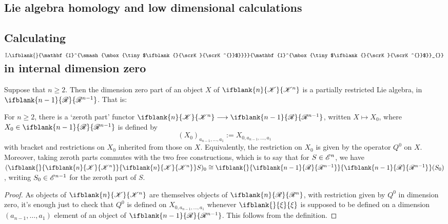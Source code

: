 \documentclass[10pt]{article}
\newcommand{\GS}[1]{\scrE^{#1}}
\newcommand{\PRLie}[1]%
{\ifblank{#1}{\scrR}{\scrR^{#1}}}
\newcommand{\LL}[1]{\ifblank{#1}{\scrK}{\scrK^{#1}}}
\newcommand{\Ind}[2][]{\ifblank{#1}{\mathbf{I}^{\smash{\mbox{\tiny $#2$}}}}{\mathbf{I}^{\mbox{\tiny $#2$}}_{#1}}}%
\newcommand{\Fr}[2][]{\ifblank{#1}{#2}{#2_{#1}}}
\newcommand{\restn}[2][]{\ifblank{#1}{\xi{#2}}{\xi_{#1}{#2}}}%
\newcommand{\derived}{\mathbb{L}}
\renewcommand{\Q}{Q}
\begin{document}
\begin{DerivedFunctorsLowDimension}
\section{Lie algebra homology and low dimensional calculations}
\subsection{Calculating $\derived\Ind{\LL{}}$ in internal dimension zero}
Suppose that $n\geq2$. Then the dimension zero part of an object $X$ of $\LL{n}$ is a partially restricted Lie algebra, in $\PRLie{n-1}$. That is: 
\begin{lem}
For $n\geq2$, there is a `zeroth part' functor $\LL{n}\to\PRLie{n-1}$, written $X\mapsto X_0$, where $X_0\in\PRLie{n-1}$ is defined by
\[(X_0)_{a_{n-1},\ldots,a_1}:=X_{0,a_{n-1},\ldots,a_1}\]
with bracket and restrictions on $X_0$ inherited from those on $X$. Equivalently, the restriction on $X_0$ is given by the operator $\Q^0$ on $X$. Moreover, taking zeroth parts commutes with the two free constructions, which is to say that for $S\in\GS{n}$, we have $(\Fr{\LL{n}}S)_0\cong\Fr{\PRLie{n-1}}(S_0)$, writing $S_0\in\GS{n-1}$ for the zeroth part of $S$.
\end{lem}
\begin{proof}
As objects of $\LL{n}$ are themselves objects of $\PRLie{n}$, with restriction given by $\Q^0$ in dimension zero, it's enough just to check that $\Q^0$ is defined on $X_{0,a_{n-1},\ldots,a_1}$ whenever $\restn{}$ is supposed to be defined on a dimension $(a_{n-1},\ldots,a_1)$ element of an object of $\PRLie{n-1}$. This follows from the definition.


\end{proof}
\end{DerivedFunctorsLowDimension}
\end{document}
